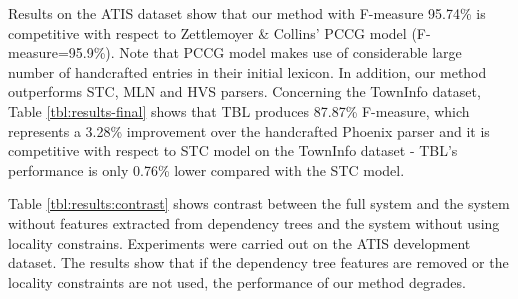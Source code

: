 \documentclass{article}
\newcommand{\efgr}[2]{
  \begin{figure}[htbp]
    \makebox[8.5cm]{\framebox[5cm]{\rule{0pt}{5cm}}}
    \caption{#2}
    \label{#1}
  \end{figure}
}
\begin{document}
Results on the ATIS dataset show that our method with F-measure 95.74\% is competitive with respect to Zettlemoyer \& Collins' PCCG model \cite{zettlemoyer07} (F-measure=95.9\%). Note that PCCG model makes use of considerable large number of handcrafted entries in their initial lexicon. In addition, our method outperforms STC, MLN and HVS parsers. Concerning the TownInfo dataset, Table \ref{tbl:results-final} shows that TBL produces 87.87\% F-measure, which represents a 3.28\% improvement over the handcrafted Phoenix parser and it is competitive with respect to STC model on the TownInfo dataset - TBL's performance is only 0.76\% lower compared with the STC model.




Table \ref{tbl:results:contrast} shows contrast between the full system and the system without features extracted from dependency trees and the system without using locality constrains. Experiments were carried out on the ATIS development dataset. The results show that if the dependency tree features are removed or the locality constraints are not used, the performance of our method degrades.
\end{document}
